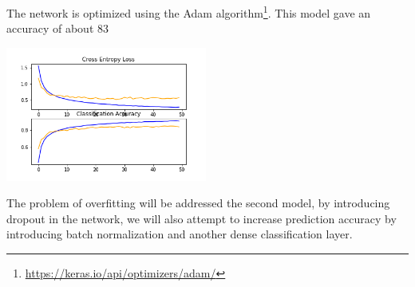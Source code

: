 The network is optimized using the Adam algorithm\footnote{\href{https://keras.io/api/optimizers/adam/}{https://keras.io/api/optimizers/adam/}}.
This model gave an accuracy of about 83%
\begin{center}
    \captionsetup{type=figure}
    \includegraphics[width=250px]{sections/exp-2/images/initial-plot.png}
\end{center}
The problem of overfitting will be addressed the second model, by introducing dropout in the network, we will also attempt to increase prediction accuracy by introducing batch normalization and another dense classification layer.
